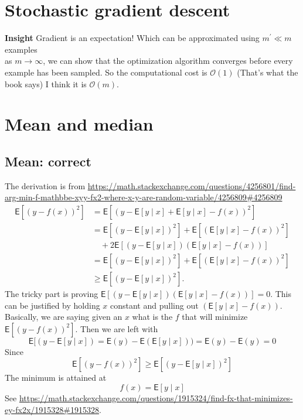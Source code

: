 \documentclass{article}
\newcommand{\beq}{\begin{equation}}
\newcommand{\eeq}{\end{equation}}
\begin{document}
\section{Stochastic gradient descent}
\textbf{Insight} Gradient is an expectation! Which can be approximated using $m^{'}\ll{m}$ examples\\
as $m\rightarrow\infty$, we can show that the optimization algorithm converges before every example has been sampled. So the computational cost is $\mathcal{O}(1)$ (That's what the book says) I think it is $\mathcal{O}(m)$.
%
%
%
\section{Mean and median}
\subsection{Mean: correct}
The derivation is from \url{https://math.stackexchange.com/questions/4256801/find-arg-min-f-mathbbe-xyy-fx2-where-x-y-are-random-variable/4256809#4256809}
\begin{align}
\mathsf{E}[(y-f(x))^2]&=\mathsf{E}[(y-\mathsf{E}[y\mid x]+\mathsf{E}[y\mid x]-f(x))^2] \\
&=\mathsf{E}[(y-\mathsf{E}[y\mid x])^2]+\mathsf{E}[(\mathsf{E}[y\mid x]-f(x))^2] \\
&\quad+2\mathsf{E}[(y-\mathsf{E}[y\mid x])(\mathsf{E}[y\mid x]-f(x))] \\
&=\mathsf{E}[(y-\mathsf{E}[y\mid x])^2]+\mathsf{E}[(\mathsf{E}[y\mid x]-f(x))^2] \\
&\ge \mathsf{E}[(y-\mathsf{E}[y\mid x])^2]. 
\end{align}
The tricky part is proving $\mathsf{E}[(y-\mathsf{E}[y\mid x])(\mathsf{E}[y\mid x]-f(x))]=0$. This can be justified by holding $x$ constant and pulling out $(\mathsf{E}[y\mid x]-f(x))$. Basically, we are saying given an $x$ what is the $f$ that will minimize $\mathsf{E}[(y-f(x))^2]$. Then we are left with
\beq
\mathsf{E}[(y-\mathsf{E}[y\mid x]) = \mathsf{E}(y) - \mathsf{E}(\mathsf{E}[y\mid x])) = \mathsf{E}(y) - \mathsf{E}(y) = 0
\eeq
Since
\beq
\mathsf{E}[(y-f(x))^2] \ge \mathsf{E}[(y-\mathsf{E}[y\mid x])^2]
\eeq
The minimum is attained at
\beq
f(x) = \mathsf{E}[y\mid x]
\eeq
See \url{https://math.stackexchange.com/questions/1915324/find-fx-that-minimizes-ey-fx2x/1915328#1915328}.  
\end{document}
